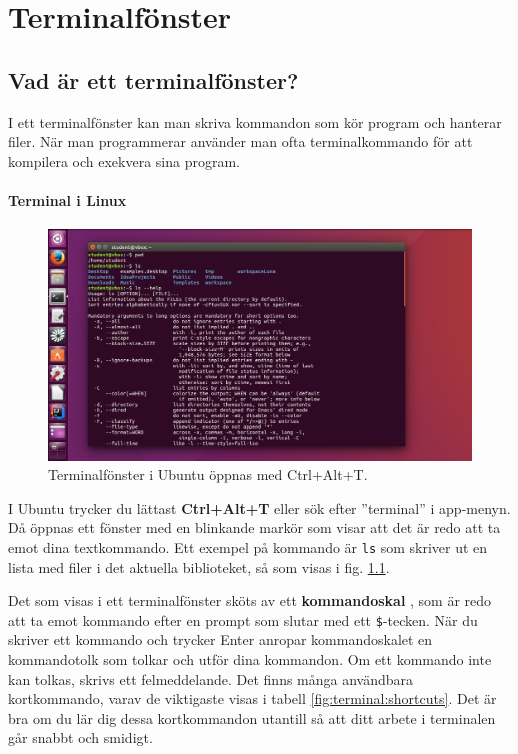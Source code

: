 
\chapter{Terminalfönster}\label{appendix:terminal}

\section{Vad är ett terminalfönster?}

I ett terminalfönster kan man skriva kommandon som kör program och hanterar filer. När man programmerar använder man ofta terminalkommando för att kompilera och exekvera sina program.  
 
\subsubsection{Terminal i Linux}

    \begin{figure}[!b]
    \centering
    \includegraphics[width=1.0\textwidth]{../img/linux-terminal.png}
    \caption{Terminalfönster i Ubuntu öppnas med Ctrl+Alt+T.}
    \label{fig:terminal:linux}
    \end{figure}

I Ubuntu trycker du lättast \textbf{Ctrl+Alt+T} eller sök efter ''terminal'' i app-menyn.  Då öppnas ett fönster med en blinkande markör som visar att det är redo att ta emot dina textkommando. Ett exempel på kommando är \texttt{ls} som skriver ut en lista med filer i det aktuella biblioteket, så som visas i fig. \ref{fig:terminal:linux}.

Det som visas i ett terminalfönster sköts av ett \textbf{kommandoskal} , som är redo att ta emot kommando efter en prompt som slutar med ett \texttt{\$}-tecken. När du skriver ett kommando och trycker Enter anropar kommandoskalet en kommandotolk som tolkar och utför dina kommandon. Om ett kommando inte kan tolkas, skrivs ett felmeddelande. Det finns många användbara kortkommando, varav de viktigaste visas i tabell \ref{fig:terminal:shortcuts}. Det är bra om du lär dig dessa kortkommandon utantill så att ditt arbete i terminalen går snabbt och smidigt.

